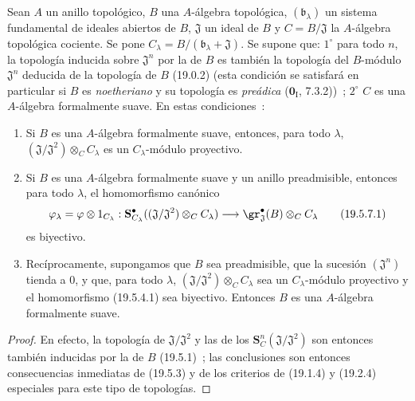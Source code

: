 \begin{corollary}[19.5.7]
\label{0.19.5.7-fr}
Sean $A$ un anillo topológico, $B$ una $A$-álgebra topológica,
$(\mathfrak b_\lambda)$ un sistema fundamental de ideales abiertos de $B$,
$\mathfrak J$ un ideal de $B$ y $C=B/\mathfrak J$ la $A$-álgebra topológica
cociente. Se pone $C_\lambda=B/(\mathfrak b_\lambda+\mathfrak J)$. Se supone
que: $1^\circ$ para todo $n$, la topología inducida sobre $\mathfrak J^n$ por
la de $B$ es también la topología del $B$-módulo $\mathfrak J^n$ deducida de
la topología de $B$ \textup{(19.0.2) (esta condición se satisfará en particular si
$B$ es \emph{noetheriano} y su topología es \emph{preádica} ($\mathbf 0_{\mathrm I}$,
7.3.2))}~; $2^\circ$ $C$ es una $A$-álgebra formalmente suave. En estas
condiciones~:
\begin{enumerate}
  \item[\rm(i)] Si $B$ es una $A$-álgebra formalmente suave, entonces, para todo
  $\lambda$, $(\mathfrak J/\mathfrak J^2)\otimes_C C_\lambda$ es un
  $C_\lambda$-módulo proyectivo.
  \item[\rm(ii)] Si $B$ es una $A$-álgebra formalmente suave y un anillo
  preadmisible, entonces para todo $\lambda$, el homomorfismo canónico
  \begin{equation}
  \label{0.19.5.7.1-fr}
    \varphi_\lambda=\varphi\otimes 1_{C_\lambda}:
    \mathbf S_{C_\lambda}^\bullet((\mathfrak J/\mathfrak J^2)\otimes_C C_\lambda)
    \longrightarrow\gr_{\mathfrak J}^\bullet(B)\otimes_C C_\lambda
    \tag{19.5.7.1}
  \end{equation}
  es biyectivo.


  \item[\rm(iii)] Recíprocamente, supongamos que $B$ sea preadmisible, que la
  sucesión $(\mathfrak J^n)$ tienda a $0$, y que, para todo $\lambda$,
  $(\mathfrak J/\mathfrak J^2)\otimes_C C_\lambda$ sea un $C_\lambda$-módulo
  proyectivo y el homomorfismo \textup{(19.5.4.1)} sea biyectivo. Entonces $B$ es una
  $A$-álgebra formalmente suave.
\end{enumerate}
\end{corollary}

\begin{proof}
En efecto, la topología de $\mathfrak J/\mathfrak J^2$ y las de los
$\mathbf S_C^n(\mathfrak J/\mathfrak J^2)$ son entonces también inducidas por la
de $B$ (19.5.1)~; las conclusiones son entonces consecuencias inmediatas de
(19.5.3) y de los criterios de (19.1.4) y (19.2.4) especiales para este tipo de
topologías.
\end{proof}

